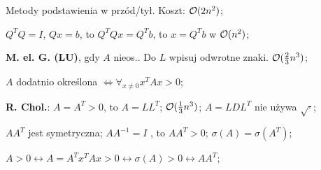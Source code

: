 
\entry
Metody podstawienia w przód/tył. Koszt: $\mathcal{O}(2n^2)$;

\entry
$Q^TQ=I$, $Qx=b$, to $Q^TQx=Q^Tb$, to $x=Q^Tb$ w $\mathcal{O}(n^2)$;




\entry
\textbf{M. el. G. (LU)}, gdy $A$ nieos..
Do $L$ wpisuj odwrotne znaki.
$\mathcal{O}(\frac{2}{3}n^3)$;

\entry
$A$ dodatnio określona $\iff \forall_{x \neq 0} x^TAx>0$;

\entry
\textbf{R. Chol.}:
$A=A^T>0$,
to
$A=LL^T$;
$\mathcal{O}(\frac{1}{3}n^3)$;
$A=LDL^T$
nie używa
$\sqrt{\cdot}$;

\entry
$AA^T$ jest symetryczna;
\entry
$AA^{-1}=I$ , to $AA^T>0$;
\entry
$\sigma(A) = \sigma(A^T)$;

\entry
$
A>0
\leftrightarrow A=A^Tx^TAx > 0
\leftrightarrow \sigma(A) > 0
\leftrightarrow AA^T
$;
